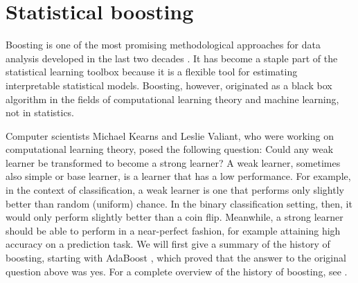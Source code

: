 \chapter{Statistical boosting}\label{ch:boosting}
Boosting is one of the most promising methodological approaches for data analysis developed in the last two decades \citep{mayr14a}.
It has become a staple part of the statistical learning toolbox because it is a flexible tool for estimating interpretable statistical models.
Boosting, however, originated as a black box algorithm in the fields of computational learning theory and machine learning, not in statistics.

Computer scientists Michael Kearns and Leslie Valiant, who were working on computational learning theory, posed the following question: 
Could any weak learner be transformed to become a strong learner? \citep{kearnsvaliant}
A weak learner, sometimes also simple or base learner, is a learner that has a low performance.
For example, in the context of classification, a weak learner is one that performs only slightly better than random (uniform) chance.
In the binary classification setting, then, it would only perform slightly better than a coin flip.
Meanwhile, a strong learner should be able to perform in a near-perfect fashion, for example attaining high accuracy on a prediction task.
We will first give a summary of the history of boosting, starting with AdaBoost \citep{adaboost}, which proved that the answer to the original question above was yes.
For a complete overview of the history of boosting, see \citet{mayr14a, mayr14b, mayr17}.

